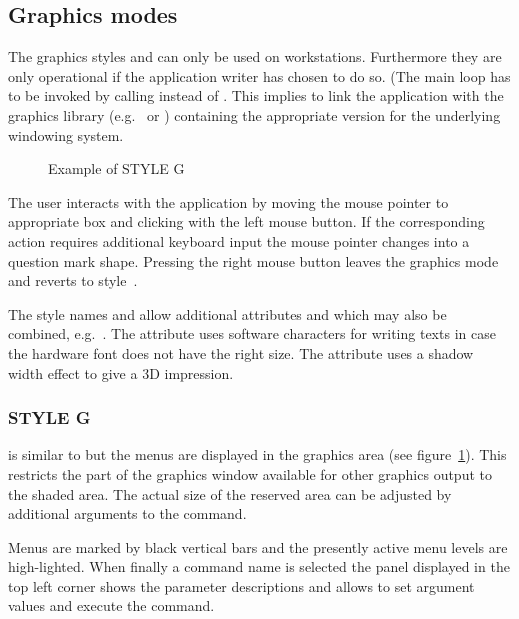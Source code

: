 \subsection{Graphics modes}

The graphics styles  and  can only be used on
workstations.
Furthermore they are only operational if the application writer has
chosen to do so. 
(The \KUIP{} main loop has to be invoked by calling 
instead of .
This implies to link the application with the graphics library
(e.g.\  or ) containing the appropriate
\HIGZ{} version for the underlying windowing system. 

\begin{figure}[tb]
\begin{center}
\mbox{}
\end{center}
\caption{Example of STYLE G}
\label{FIG4}
\end{figure}

The user interacts with the application by moving the mouse pointer to
appropriate box and clicking with the left mouse button.
If the corresponding action requires additional keyboard input the mouse
pointer changes into a question mark shape.
Pressing the right mouse button leaves the graphics mode and reverts to
style~.

The style names  and  allow additional attributes
 and  which may also be combined, e.g.\
.
The attribute  uses software characters for writing texts in
case the hardware font does not have the right size.
The attribute  uses a shadow width effect to give a 3D impression.


\subsubsection{STYLE G}

 is similar to  but the
menus are displayed in the graphics area (see figure~\ref{FIG4}).
This restricts the part of the graphics window available for other
graphics output to the shaded area.
The actual size of the reserved area can be adjusted by additional arguments
to the \Cind{STYLE} command.

Menus are marked by black vertical bars and the presently active menu
levels are high-lighted.
When finally a command name is selected the panel displayed in the top
left corner shows the parameter descriptions and allows to set argument
values and execute the command.


